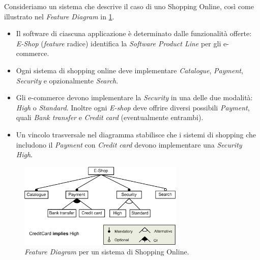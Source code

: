 \documentclass[12pt]{report}
\newcommand{\torevise}[1]{\textcolor{red}{#1}}
\begin{document}
\begin{mdframed}
\small
Consideriamo un sistema che descrive il caso di uno \textsf{Shopping Online}, così come illustrato nel \textit{Feature Diagram} in \cref{fig:diagramma}.

\begin{itemize}
\item Il software di ciascuna applicazione è determinato dalle funzionalità offerte: \textit{E-Shop} (\textit{feature} radice) identifica la \textit{Software Product Line} per gli e-commerce.
\item Ogni sistema di shopping online deve implementare \textit{Catalogue}, \textit{Payment}, \textit{Security} e opzionalmente \textit{Search}.
\item Gli e-commerce devono implementare la \textit{Security} in una delle due modalità: \textit{High} o \textit{Standard}. Inoltre ogni \textit{E-shop} deve offrire  diversi possibili \textit{Payment}, quali \textit{Bank transfer} e \textit{Credit card} (eventualmente entrambi).
\item Un vincolo trasversale nel diagramma stabilisce che i sistemi di shopping che includono il \textit{Payment} con \textit{Credit card} devono implementare una \textit{Security} \textit{High}.
\end{itemize}

\begin{figure}[H]
\centering
\includegraphics[width=0.7\textwidth]{diagramma.png}
\caption{\textit{Feature Diagram} per un sistema di Shopping Online.}
\label{fig:diagramma}
\end{figure}
\end{mdframed}
\end{document}
